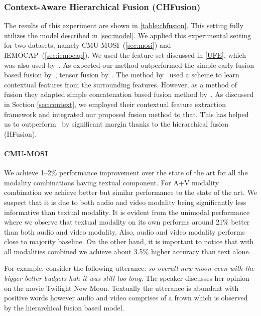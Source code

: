 \documentclass[review]{elsarticle}
\newcommand\?[1]{\hl{#1}}
\begin{document}
\subsubsection{Context-Aware Hierarchical Fusion (CHFusion)}
\label{chfusion}

The results of this experiment are shown in \cref{table:chfusion}. This setting
fully utilizes the model described in \cref{sec:model}. We applied this
experimental setting for two datasets, namely CMU-MOSI~(\cref{sec:mosi}) and
IEMOCAP~(\cref{sec:iemocap}). We used the feature set discussed in \cref{UFE},
which was also used by~\citet{porcon}. As expected our method outperformed the simple early fusion based fusion by~\citep{pordee}, tensor fusion by~\citep{zadten}. The method by~\citet{porcon} used a scheme to learn contextual features from the surrounding features. However, as a method of fusion they adapted simple concatenation based fusion method by~\citep{pordee}. As discussed in Section \ref{sec:context}, we employed their contextual feature extraction framework and integrated our proposed fusion method to that. This has helped us to outperform~\citet{porcon} by significant margin thanks to the hierarchical fusion (HFusion).

\paragraph{CMU-MOSI}
We achieve 1--2\% performance improvement over the state of the art
\citep{porcon} for all the modality combinations having textual
component. For A+V modality combination we achieve better but similar
performance to the state of the art. We suspect that it is due to both audio and
video modality being significantly less informative than textual modality. It is
evident from the unimodal performance where we observe that textual modality on
its own performs around 21\% better than both audio and video modality. Also,
audio and video modality performs close to majority baseline. On the other hand,
it is important to notice that with all modalities combined we achieve about
3.5\% higher accuracy than text alone.



For example, consider the following utterance: \emph{so overall new moon even with the bigger better budgets huh it was still too long}.
The speaker discusses her opinion on the movie Twilight New Moon. Textually the
utterance is abundant with positive words however audio and video comprises of a
frown which is observed by the hierarchical fusion based model.
\end{document}
